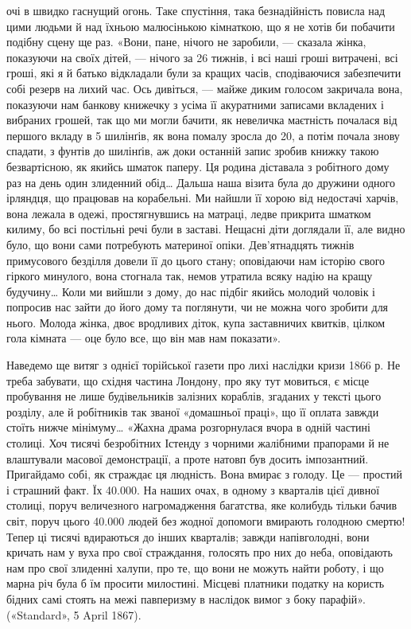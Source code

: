 \parcont{}  %
очі в швидко гаснущий огонь. Таке спустіння, така безнадійність
повисла над цими людьми й над їхньою малюсінькою кімнаткою,
що я не хотів би побачити подібну сцену ще раз. «Вони,
пане, нічого не заробили, — сказала жінка, показуючи на своїх
дітей, — нічого за 26 тижнів, і всі наші гроші витрачені, всі гроші,
які я й батько відкладали були за кращих часів, сподіваючися
забезпечити собі резерв на лихий час. Ось дивіться, — майже
диким голосом закричала вона, показуючи нам банкову книжечку
з усіма її акуратними записами вкладених і вибраних грошей,
так що ми могли бачити, як невеличка маєтність почалася
від першого вкладу в 5 шилінґів, як вона помалу зросла до
20, а потім почала знову спадати, з фунтів до
шилінґів, аж доки останній запис зробив книжку такою безвартісною,
як якийсь шматок паперу. Ця родина діставала з робітного
дому раз на день один злиденний обід\dots{} Дальша наша візита
була до дружини одного ірляндця, що працював на корабельні.
Ми найшли її хорою від недостачі харчів, вона лежала в одежі,
простягнувшись на матраці, ледве прикрита шматком килиму,
бо всі постільні речі були в заставі. Нещасні діти доглядали її,
але видно було, що вони сами потребують материної опіки.
Дев’ятнадцять тижнів примусового безділля довели її до цього
стану; оповідаючи нам історію свого гіркого минулого, вона
стогнала так, немов утратила всяку надію на кращу будучину\dots{}
Коли ми вийшли з дому, до нас підбіг якийсь молодий чоловік
і попросив нас зайти до його дому та поглянути, чи не можна
чого зробити для нього. Молода жінка, двоє вродливих діток,
купа заставничих квитків, цілком гола кімната — оце було все,
що він мав нам показати».

Наведемо ще витяг з однієї торійської газети про лихі наслідки
кризи 1866 р. Не треба забувати, що східня частина Лондону,
про яку тут мовиться, є місце пробування не лише будівельників
залізних кораблів, згаданих у тексті цього розділу, але й
робітників так званої «домашньої праці», що її оплата завжди
стоїть нижче мінімуму\dots{} «Жахна драма розгорнулася вчора в
одній частині столиці. Хоч тисячі безробітних Істенду з чорними
жалібними прапорами й не влаштували масової демонстрації,
а проте натовп був досить імпозантний. Пригайдамо собі, як
страждає ця людність. Вона вмирає з голоду. Це — простий і
страшний факт. Їх 40.000. На наших очах, в одному з кварталів
цієї дивної столиці, поруч величезного нагромадження багатства,
яке колибудь тільки бачив світ, поруч цього 40.000 людей без
жодної допомоги вмирають голодною смертю! Тепер ці тисячі
вдираються до інших кварталів; завжди напівголодні, вони кричать
нам у вуха про свої страждання, голосять про них до
неба, оповідають нам про свої злиденні халупи, про те, що вони
не можуть найти роботу, і що марна річ була б їм просити
милостині. Місцеві платники податку на користь бідних самі
стоять на межі павперизму в наслідок вимог з боку парафій».
(«Standard», 5 April 1867).
